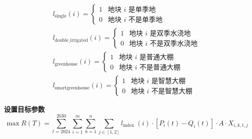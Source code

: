 \documentclass[12pt]{ctexart}
\begin{document}
	
\begin{equation}
	\begin{gathered}
		l_{\text{single}}(i) = 
		\begin{cases}
			1 & \text{地块 } i \text{ 是单季地} \\
			0 & \text{地块 } i \text{ 不是单季地}
		\end{cases} \\
		l_{\text{double\_irrigated}}(i) = 
		\begin{cases}
			1 & \text{地块 } i \text{ 是双季水浇地} \\
			0 & \text{地块 } i \text{ 不是双季水浇地}
		\end{cases} \\
		l_{\text{greenhouse}}(i) = 
		\begin{cases}
			1 & \text{地块 } i \text{ 是普通大棚} \\
			0 & \text{地块 } i \text{ 不是普通大棚}
		\end{cases} \\
		l_{\text{smartgreenhouse}}(i) = 
		\begin{cases}
			1 & \text{地块 } i \text{ 是智慧大棚} \\
			0 & \text{地块 } i \text{ 不是智慧大棚}
		\end{cases}
	\end{gathered}
\end{equation}



	\textbf{设置目标参数}
	\begin{equation}
	\max R(T)=\sum_{t=2024}^{2030} \sum_{i=1}^m \sum_{k=1}^n \sum_{j \in[1,2]} l_{\text {index }}(i) \cdot\left[P_i(t)-Q_i(t)\right] \cdot A \cdot X_{i, k, t, j}
\end{equation}
	
	
	
\end{document}
